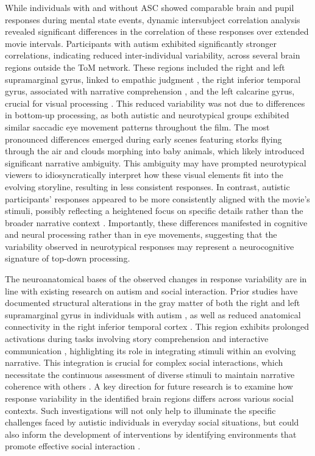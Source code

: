 While individuals with and without ASC showed comparable brain and pupil responses during mental state events, dynamic intersubject correlation analysis revealed significant differences in the correlation of these responses over extended movie intervals. Participants with autism exhibited significantly stronger correlations, indicating reduced inter-individual variability, across several brain regions outside the ToM network. These regions included the right and left supramarginal gyrus, linked to empathic judgment \citep{silani2013,wada2021}, the right inferior temporal gyrus, associated with narrative comprehension \citep{youssofzadeh2022}, and the left calcarine gyrus, crucial for visual processing \citep{woldorff2002}. This reduced variability was not due to differences in bottom-up processing, as both autistic and neurotypical groups exhibited similar saccadic eye movement patterns throughout the film. The most pronounced differences emerged during early scenes featuring storks flying through the air and clouds morphing into baby animals, which likely introduced significant narrative ambiguity. This ambiguity may have prompted neurotypical viewers to idiosyncratically interpret how these visual elements fit into the evolving storyline, resulting in less consistent responses. In contrast, autistic participants' responses appeared to be more consistently aligned with the movie's stimuli, possibly reflecting a heightened focus on specific details rather than the broader narrative context \citep{losh2003,tager-flusberg1995,barnes2012,geelhand2020,koldewyn2014}. Importantly, these differences manifested in cognitive and neural processing rather than in eye movements, suggesting that the variability observed in neurotypical responses may represent a neurocognitive signature of top-down processing.

The neuroanatomical bases of the observed changes in response variability are in line with existing research on autism and social interaction. Prior studies have documented structural alterations in the gray matter of both the right and left supramarginal gyrus in individuals with autism \citep{brieber2007,ke2008,libero2014}, as well as reduced anatomical connectivity in the right inferior temporal cortex \citep{boets2018,koldewyn2014}. This region exhibits prolonged activations during tasks involving story comprehension and interactive communication \citep{youssofzadeh2022,stolk2013}, highlighting its role in integrating stimuli within an evolving narrative. This integration is crucial for complex social interactions, which necessitate the continuous assessment of diverse stimuli to maintain narrative coherence with others \citep{goffman1974,johnson2023,stolk2022}. A key direction for future research is to examine how response variability in the identified brain regions differs across various social contexts. Such investigations will not only help to illuminate the specific challenges faced by autistic individuals in everyday social situations, but could also inform the development of interventions by identifying environments that promote effective social interaction \citep{wadge2019}.

